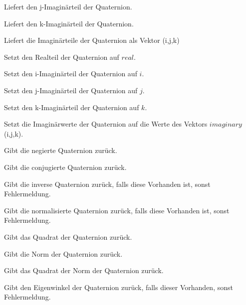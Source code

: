 		\descr
		{
			Liefert den j-Imaginärteil der Quaternion.
		}
		
		\descr
		{
			Liefert den k-Imaginärteil der Quaternion.
		}
		
    \descr
    {
    	Liefert die Imaginärteile der Quaternion als Vektor (i,j,k)
    }
 
 		\descr
 		{
 			Setzt den Realteil der Quaternion auf $real$.
 		}
 		
 		\descr
 		{
 			Setzt den i-Imaginärteil der Quaternion auf $i$.
 		}
 		
 		\descr
 		{
 			Setzt den j-Imaginärteil der Quaternion auf $j$.
 		}
 		
 		\descr
 		{
 			Setzt den k-Imaginärteil der Quaternion auf $k$.
 		}
 		
 		\descr
 		{
 			Setzt die Imaginärwerte der Quaternion auf die Werte des Vektors $imaginary$ 			(i,j,k).
 		}
 		
 		\descr
 		{
 			 Gibt die negierte Quaternion zurück.
 		}
 		
 		\descr
 		{
 			 Gibt die conjugierte Quaternion zurück.
 		}
 		
 		\descr
 		{
 			 Gibt die inverse Quaternion zurück, falls diese Vorhanden ist, sonst Fehlermeldung.
 		}
 		
 		\descr
 		{
 			 Gibt die normalisierte Quaternion zurück, falls diese Vorhanden ist, sonst Fehlermeldung.
 		}
 		
 		\descr
 		{
 			 Gibt das Quadrat der Quaternion zurück.
 		}
 		
 		\descr
 		{
 			 Gibt die Norm der Quaternion zurück.
 		}
 		
 		\descr
 		{
 			 Gibt das Quadrat der Norm der Quaternion zurück.
 		}
 		
 		\descr
 		{
 			 Gibt den Eigenwinkel der Quaternion zurück, falls dieser Vorhanden, sonst Fehlermeldung.
 		}
 		
